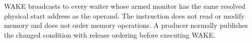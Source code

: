 WAKE broadcasts to every waiter whose armed monitor has the same resolved physical start address as the operand.
The instruction does not read or modify memory and does not order memory operations. A producer normally publishes
the changed condition with release ordering before executing WAKE.
